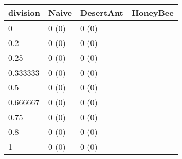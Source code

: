 \begin{tabular} {|l|l|l|l|}
\hline
division & Naive & DesertAnt & HoneyBee \\
\hline
0 & 0 (0)  & 0 (0)  &  \\
0.2 & 0 (0)  & 0 (0)  &  \\
0.25 & 0 (0)  & 0 (0)  &  \\
0.333333 & 0 (0)  & 0 (0)  &  \\
0.5 & 0 (0)  & 0 (0)  &  \\
0.666667 & 0 (0)  & 0 (0)  &  \\
0.75 & 0 (0)  & 0 (0)  &  \\
0.8 & 0 (0)  & 0 (0)  &  \\
1 & 0 (0)  & 0 (0)  &  \\
\hline
\end{tabular}
